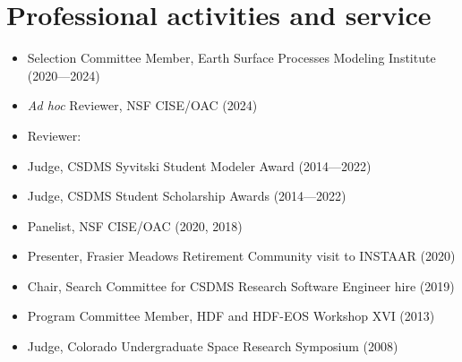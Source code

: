 \section{Professional activities and service}
\vspace{0.5em}

\begin{itemize}

  \item Selection Committee Member, Earth Surface Processes Modeling Institute (2020---2024)

  \item \textit{Ad hoc} Reviewer, NSF CISE/OAC (2024)

  \item Reviewer:

  \item Judge, CSDMS Syvitski Student Modeler Award (2014---2022)

  \item Judge, CSDMS Student Scholarship Awards (2014---2022)

  \item Panelist, NSF CISE/OAC (2020, 2018)

  \item Presenter, Frasier Meadows Retirement Community visit to INSTAAR (2020)

  \item Chair, Search Committee for CSDMS Research Software Engineer hire (2019)

  \item Program Committee Member, HDF and HDF-EOS Workshop XVI (2013)

  \item Judge, Colorado Undergraduate Space Research Symposium (2008)

\end{itemize}
